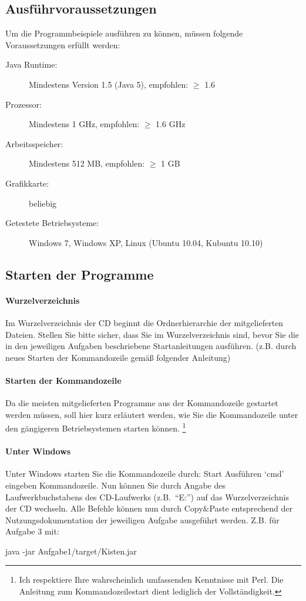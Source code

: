 \documentclass[a4paper,10pt]{scrartcl}
\theoremstyle{definition}
\theoremstyle{remark}
\begin{document}
\subsection{Ausführvoraussetzungen}
\label{Vor}
Um die Programmbeispiele ausführen zu können, müssen folgende Voraussetzungen erfüllt werden:
\begin{description}
 \item[Java Runtime:] Mindestens Version 1.5 (Java 5), empfohlen: $\geq$ 1.6 
 \item[Prozessor:] Mindestens 1 GHz, empfohlen: $\geq$ 1.6 GHz
 \item[Arbeitsspeicher:] Mindestens 512 MB, empfohlen: $\geq$ 1 GB
 \item[Grafikkarte:] beliebig
 \item[Getestete Betriebsysteme:] Windows 7, Windows XP, Linux (Ubuntu 10.04, Kubuntu 10.10)
\end{description}
\subsection{Starten der Programme}
\paragraph{Wurzelverzeichnis} Im Wurzelverzeichnis der CD beginnt die Ordnerhierarchie der mitgelieferten Dateien.
Stellen Sie bitte sicher, dass Sie im Wurzelverzeichnis sind, bevor Sie die in den jeweiligen Aufgaben beschriebene Startanleitungen ausführen.
(z.B. durch neues Starten der Kommandozeile gemäß folgender Anleitung)
\paragraph{Starten der Kommandozeile}
Da die meisten mitgelieferten Programme aus der Kommandozeile gestartet werden müssen, soll hier kurz erläutert werden,
wie Sie die Kommandozeile unter den gängigeren Betriebsystemen starten können.
\footnote{Ich respektiere Ihre wahrscheinlich umfassenden Kenntnisse mit Perl. Die Anleitung zum Kommandozeilestart dient lediglich der Vollständigkeit.}
\newcommand{\then}{\textrightarrow{} }
\paragraph{Unter Windows}
Unter Windows starten Sie die Kommandozeile durch: Start \then Ausführen \then `cmd' eingeben \then Kommandozeile.
Nun können Sie durch Angabe des Laufwerkbuchstabens des CD-Laufwerks (z.B.\ ``E:'') auf das Wurzelverzeichnis der CD wechseln.
Alle Befehle können nun durch Copy\&Paste entsprechend der Nutzungsdokumentation der jeweiligen Aufgabe ausgeführt werden. Z.B. für Aufgabe 3 mit:
\begin{center} java -jar Aufgabe1/target/Kisten.jar \end{center}
\end{document}
